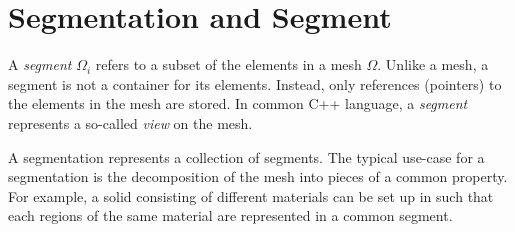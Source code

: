 \section{Segmentation and Segment}
A \emph{segment} $\Omega_i$ refers to a subset of the elements in a mesh $\Omega$. Unlike a mesh, a segment is not a container for its elements. Instead, only references (pointers) to the elements in the mesh are stored. In common C++ language, a \emph{segment} represents a so-called \emph{view} on the mesh.

A segmentation represents a collection of segments. The typical use-case for a segmentation is the decomposition of the mesh into pieces of a common property. For example, a solid consisting of different materials can be set up in {\ViennaGrid} such that each regions of the same material are represented in a common segment.
